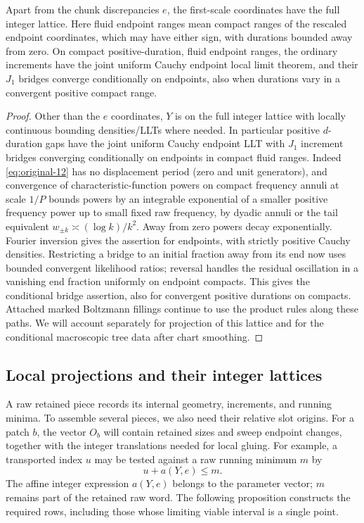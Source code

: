 \begin{lemma}\label{kern:endpoint-llt}
Apart from the chunk discrepancies \(e\), the first-scale coordinates have the full integer lattice.
Here fluid endpoint ranges mean compact ranges of the rescaled endpoint coordinates,
which may have either sign, with durations bounded away from zero.
On compact positive-duration, fluid endpoint ranges, the ordinary increments have the joint uniform
Cauchy endpoint local limit theorem, and their \(J_1\) bridges converge conditionally on endpoints,
also when durations vary in a convergent positive compact range.
\end{lemma}
\begin{proof}

Other than the \(e\) coordinates, \(Y\) is on the full integer lattice with locally continuous bounding
densities/LLTs where needed. In particular positive \(d\)-duration gaps have the joint uniform Cauchy
endpoint LLT with \(J_1\) increment bridges converging conditionally on endpoints in compact fluid ranges.
Indeed \eqref{eq:original-12} has no displacement period (zero and unit generators), and convergence of
characteristic-function powers on compact frequency annuli at scale \(1/P\) bounds powers by an integrable
exponential of a smaller positive frequency power up to small fixed raw frequency, by dyadic annuli or the
tail equivalent \(w_{\pm k}\asymp(\log k)/k^2\). Away from zero powers decay exponentially. Fourier
inversion gives the assertion for endpoints, with strictly positive Cauchy densities. Restricting a bridge
to an initial fraction away from its end now uses bounded convergent likelihood ratios; reversal handles the
residual oscillation in a vanishing end fraction uniformly on endpoint compacts. This gives the conditional
bridge assertion, also for convergent positive durations on compacts. Attached marked Boltzmann fillings
continue to use the product rules along these paths. We will account separately for projection of this
lattice and for the conditional macroscopic tree data after chart smoothing.

\end{proof}

\subsection{Local projections and their integer lattices}

A raw retained piece records its internal geometry, increments, and running minima.
To assemble several pieces, we also need their relative slot origins. For a patch
$b$, the vector $O_b$ will contain retained sizes and sweep endpoint changes,
together with the integer translations needed for local gluing. For example, a
transported index $u$ may be tested against a raw running minimum $m$ by
\[
 u+a(Y,e)\le m.
\]
The affine integer expression $a(Y,e)$ belongs to the parameter vector; $m$
remains part of the retained raw word. The following proposition constructs the
required rows, including those whose limiting viable interval is a single point.

